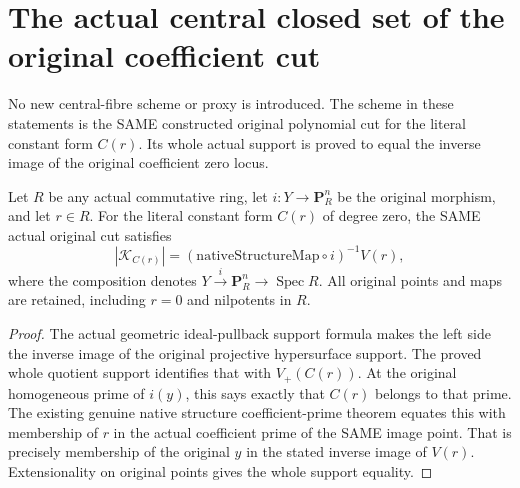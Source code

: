 \section{The actual central closed set of the original coefficient cut}
No new central-fibre scheme or proxy is introduced. The scheme in these
statements is the SAME constructed original polynomial cut
for the literal constant form $C(r)$. Its whole actual support is proved
to equal the inverse image of the original coefficient zero locus.

\begin{lemma}
\label{lem:pl-gauss-original-coefficient-cut-support}
\leanok
Let $R$ be any actual commutative ring, let $i:Y\to\mathbf P^n_R$ be
the original morphism, and let $r\in R$. For the literal constant form
$C(r)$ of degree zero, the SAME actual original cut satisfies
\[
 \left|\mathcal K_{C(r)}\right|
 = (\mathrm{nativeStructureMap}\circ i)^{-1}V(r),
\]
where the composition denotes $Y\xrightarrow{i}\mathbf P^n_R\to
\operatorname{Spec}R$. All original points and maps are retained,
including $r=0$ and nilpotents in $R$.
\end{lemma}
\begin{proof}
The actual geometric ideal-pullback support formula makes the left
side the inverse image of the original projective hypersurface support.
The proved whole quotient support identifies that with $V_+(C(r))$.
At the original homogeneous prime of $i(y)$, this says exactly that
$C(r)$ belongs to that prime. The existing genuine native structure
coefficient-prime theorem equates this with membership of $r$ in the
actual coefficient prime of the SAME image point. That is precisely
membership of the original $y$ in the stated inverse image of $V(r)$.
Extensionality on original points gives the whole support equality.
\end{proof}

